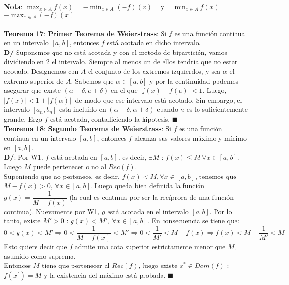 \documentclass[11pt,a4paper]{article}
\newcommand*{\QEDA}{\null\nobreak\hfill\ensuremath{\blacksquare}}
\begin{document}
\noindent \textbf{Nota}: $\displaystyle{\max_{x\in A} f(x)}$ = $\displaystyle{-\min_{x\in A} (-f)(x)} \ \ \ \ $ y $\ \ \ \ \displaystyle{\min_{x\in A} f(x)}$ = $\displaystyle{-\max_{x\in A} (-f)(x)}$\\ \\

\noindent \textbf{Teorema 17}: \textbf{Primer Teorema de Weierstrass}: Si $f$ es una funci\'on continua en un intervalo $[a,b]$, entonces $f$ est\'a acotada en dicho intervalo.\\
\textbf{D/} Suponemos que no est\'a acotada y con el metodo de bipartici\'on, vamos dividiendo en 2 el intervalo. Siempre al menos un de ellos tendria que no estar acotado. Designemos con $A$ el conjunto de los extremos izquierdos, y sea $\alpha$ el extremo superior de $A$. Sabemos que $\alpha \in [a,b]$ y por la continuidad podemos asegurar que existe $(\alpha - \delta, a + \delta)$ en el que $|f(x)-f(a)| < 1$. Luego, $|f(x)| < 1 + |f(\alpha)|$, de modo que ese intervalo est\'a acotado. Sin embargo, el intervalo $[a_n,b_n]$ esta incluido en $(\alpha - \delta, \alpha + \delta)$ cuando $n$ es lo suficientemente grande. Ergo $f$ est\'a acotada, contadiciendo la hipotesis. \QEDA\\

\noindent \textbf{Teorema 18}: \textbf{Segundo Teorema de Weierstrass}: Si $f$ es una funci\'on continua en un intervalo $[a,b]$, entonces $f$ alcanza sus valores m\'aximo y m\'inimo en $[a,b]$.\\
\textbf{D/}: Por W1, $f$ est\'a acotada en $[a,b]$, es decir, $\exists M$ : $f(x)\leq M\ \forall x \in [a,b]$.\\ Luego $M$ puede pertenecer o no al $Rec(f)$. \\ 
Suponiendo que no pertenece, es decir, $f(x)<M, \forall x \in [a,b]$, tenemos que $M-f(x)>0,\ \forall x \in [a,b]$. Luego queda bien definida la funci\'on $g(x)=\dfrac{1}{M-f(x)}$ (la cual es continua por ser la rec\'iproca de una funci\'on continua). Nuevamente por W1, $g$ est\'a acotada en el intervalo $[a,b]$. Por lo tanto, existe $M' > 0$ : $g(x) < M',\ \forall x \in [a,b]$. En consecuencia se tiene que:
$$0 < g(x) < M' \Rightarrow 0 < \dfrac{1}{M-f(x)} < M' \Rightarrow 0 < \dfrac{1}{M'} < M - f(x) \Rightarrow f(x) < M-\dfrac{1}{M'} < M$$
Esto quiere decir que $f$ admite una cota superior estrictamente menor que $M$, asumido como supremo.\\
\noindent Entonces $M$ tiene que pertenecer al $Rec(f)$, luego existe $x^* \in Dom(f)$ : $f(x^*)=M$ y la existencia del m\'aximo est\'a probada. \QEDA \\
\end{document}
